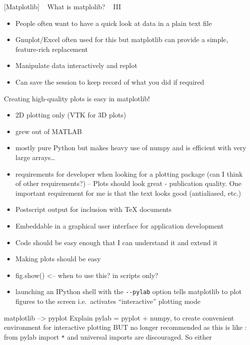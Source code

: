\documentclass{article}
\begin{document}
    {[}Matplotlib{]} ~ What is matplolib? ~ III

\begin{itemize}
\item
  People often want to have a quick look at data in a plain text file
\item
  Gnuplot/Excel often used for this but matplotlib can provide a simple,
  feature-rich replacement
\item
  Manipulate data interactively and replot
\item
  Can save the session to keep record of what you did if required
\end{itemize}

Creating high-quality plots is easy in matplotlib!

    \begin{itemize}
\itemsep1pt\parskip0pt
\item
  2D plotting only (VTK for 3D plots)
\item
  grew out of MATLAB
\item
  mostly pure Python but makes heavy use of numpy and is efficient with
  very large arrays\ldots{}
\item
  requirements for developer when looking for a plotting package (can I
  think of other requirements?)-- Plots should look great - publication
  quality. One important requirement for me is that the text looks good
  (antialiased, etc.)
\item
  Postscript output for inclusion with TeX documents
\item
  Embeddable in a graphical user interface for application development
\item
  Code should be easy enough that I can understand it and extend it
\item
  Making plots should be easy
\end{itemize}

    \begin{itemize}
\item
  fig.show() \textless{}-- when to use this? in scripts only?
\item
  launching an IPython shell with the \texttt{-{}-pylab} option tells
  matplotlib to plot figures to the screen i.e.~activates
  ``interactive'' plotting mode
\end{itemize}

matplotlib --\textgreater{} pyplot Explain pylab = pyplot + numpy, to
create convenient environment for interactive plotting BUT no longer
recommended as this is like : from pylab import \texttt{*} and universal
imports are discouraged. So either
\end{document}

